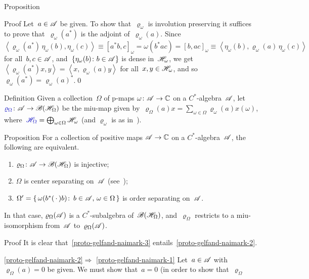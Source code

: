 \documentclass[a]{subfiles}
\begin{document}
\begin{parsec}
\begin{point}{Proposition}
\begin{point}{Proof}
Let~$a\in\mathscr{A}$ be given.
To show that~$\varrho_\omega$ is involution preserving
it suffices to prove that~$\varrho_\omega(a^*)$
is the adjoint of~$\varrho_\omega(a)$.
Since~$\left<\varrho_\omega(a^*)\,\eta_\omega(b),\eta_\omega(c)\right>
\equiv [a^*b,c]_\omega = \omega(b^*ac)=[b,ac]_\omega
\equiv \left<\eta_\omega(b),\varrho_\omega(a)\,\eta_\omega(c)\right>$
for all~$b,c\in\mathscr{A}$,
and~$\{\eta_\omega(b)\colon b\in\mathscr{A}\}$
is dense in~$\mathscr{H}_\omega$,
we get~$\left<\varrho_\omega(a^*)x,y\right>=\left<x,\varrho_\omega(a)y\right>$
for all~$x,y\in\mathscr{H}_\omega$,
and so~$\varrho_\omega(a^*)=\varrho_\omega(a)^*$.\qed
\end{point}
\end{point}
\begin{point}{Definition}%
Given a collection~$\Omega$ of p-maps $\omega\colon \mathscr{A}\to\mathbb{C}$
on a $C^*$-algebra~$\mathscr{A}$,
let $\Define{\varrho_\Omega}\colon \scrA\to \scrB(\scrH_\Omega)$
be the miu-map given by~$\varrho_\Omega(a)x 
= \sum_{\omega\in\Omega} \varrho_\omega(a)x(\omega)$,
where~$\Define{\scrH_\Omega}=\bigoplus_{\omega\in\Omega}\scrH_\omega$
(and $\varrho_\omega$ is as in~).
\end{point}
\begin{point}{Proposition}%
For a collection of positive maps $\mathscr{A}\to \mathbb{C}$
on a $C^*$-algebra~$\mathscr{A}$,
the following are equivalent.
\begin{enumerate}
\item
\label{proto-gelfand-naimark-1}
$\varrho_\Omega\colon \mathscr{A}\to\mathscr{B}(\mathscr{H}_\Omega)$
is injective;
\item
\label{proto-gelfand-naimark-2}
$\Omega$ is center separating on~$\mathscr{A}$
(see~);
\item
\label{proto-gelfand-naimark-3}
$\Omega'=\{\,\omega(b^*(\,\cdot\,)b)\colon \, b\in\mathscr{A},\,\omega\in\Omega\,\}$
is order separating on~$\mathscr{A}$.
\end{enumerate}
In that case, $\varrho_\Omega(\mathscr{A})$ is a $C^*$-subalgebra
of~$\mathscr{B}(\mathscr{H}_\Omega)$,
and~$\varrho_\Omega$
restricts to a miu-isomorphism from~$\mathscr{A}$ to~$\varrho_\Omega(\mathscr{A})$.
\begin{point}{Proof}%
It is clear that~\ref{proto-gelfand-naimark-3}
entails~\ref{proto-gelfand-naimark-2}.
\begin{point}{\ref{proto-gelfand-naimark-2}$\Longrightarrow$%
\ref{proto-gelfand-naimark-1}}%
Let~$a\in \mathscr{A}$ with $\varrho_\Omega(a)=0$ be given.
We must show that~$a=0$ (in order to show that~$\varrho_\Omega$

\end{point}
\end{point}
\end{point}
\end{parsec}
\end{document}
